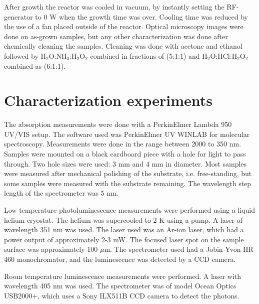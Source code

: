 After growth the reactor was cooled in vacuum, by instantly setting the RF-generator to 0 W when the growth time was over. Cooling time was reduced by the use of a fan placed outside of the reactor. Optical microscopy images were done on as-grown samples, but any other characterization was done after chemically cleaning the samples. Cleaning was done with acetone and ethanol followed by H$_2$O:NH$_3$:H$_2$O$_2$ combined in fractions of (5:1:1) and H$_2$O:HCl:H$_2$O$_2$ combined as (6:1:1).

\section{Characterization experiments}
\label{sec:experimental:characterization}
The absorption measurements were done with a PerkinElmer Lambda 950 UV/VIS setup. The software used was PerkinElmer UV WINLAB for molecular spectroscopy. Measurements were done in the range between 2000 to 350 nm. Samples were mounted on a black cardboard piece with a hole for light to pass through. Two hole sizes were used: 3 mm and 4 mm in diameter. Most samples were measured after mechanical polishing of the substrate, i.e. free-standing, but some samples were measured with the substrate remaining. The wavelength step length of the spectrometer was 5 nm. 

Low temperature photoluminescence measurements were performed using a liquid helium cryostat. The helium was supercooled to 2 K using a pump. A laser of wavelength 351 nm was used. The laser used was an Ar-ion laser, which had a power output of approximately 2-3 mW. The focused laser spot on the sample surface was approximately 100 $\mu$m. The spectrometer used had a Jobin-Yvon HR 460 monochromator, and the luminescence was detected by a CCD camera. 

Room temperature luminescence measurements were performed. A laser with wavelength 405 nm was used. The spectrometer was of model Ocean Optics USB2000+, which uses a Sony ILX511B CCD camera to detect the photons. 









































